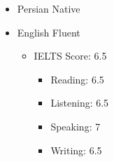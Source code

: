 \documentclass[10pt,a4paper,sans]{moderncv} %
\begin{document}
	\begin{itemize}
	\item Persian \hspace{5 pt} Native
	\item English \hspace{6 pt} Fluent   
		\begin{itemize}
			 \item IELTS Score: 6.5
			 \begin{itemize}
			 	\item Reading: 6.5 \item Listening: 6.5 \item Speaking: 7 \item Writing: 6.5 
		 	\end{itemize}
		\end{itemize}
	\end{itemize} 
	
	

\end{document}
